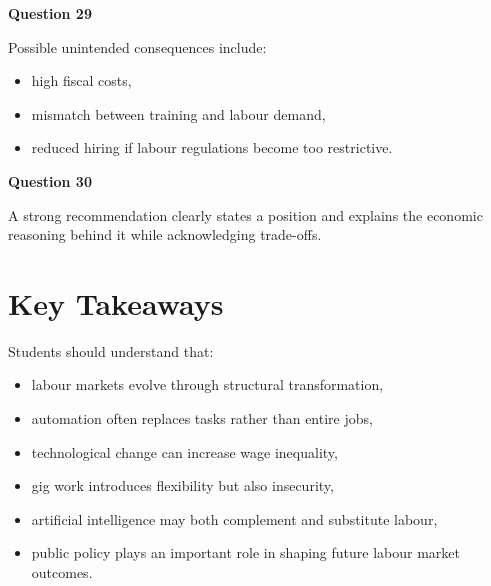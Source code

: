 \documentclass[12pt]{article}
\begin{document}
\textbf{Question 29}

Possible unintended consequences include:

\begin{itemize}
\item high fiscal costs,
\item mismatch between training and labour demand,
\item reduced hiring if labour regulations become too restrictive.
\end{itemize}

\textbf{Question 30}

A strong recommendation clearly states a position and explains the economic reasoning behind it while acknowledging trade-offs.

\section*{Key Takeaways}

Students should understand that:

\begin{itemize}
\item labour markets evolve through structural transformation,
\item automation often replaces tasks rather than entire jobs,
\item technological change can increase wage inequality,
\item gig work introduces flexibility but also insecurity,
\item artificial intelligence may both complement and substitute labour,
\item public policy plays an important role in shaping future labour market outcomes.
\end{itemize}
\end{document}
